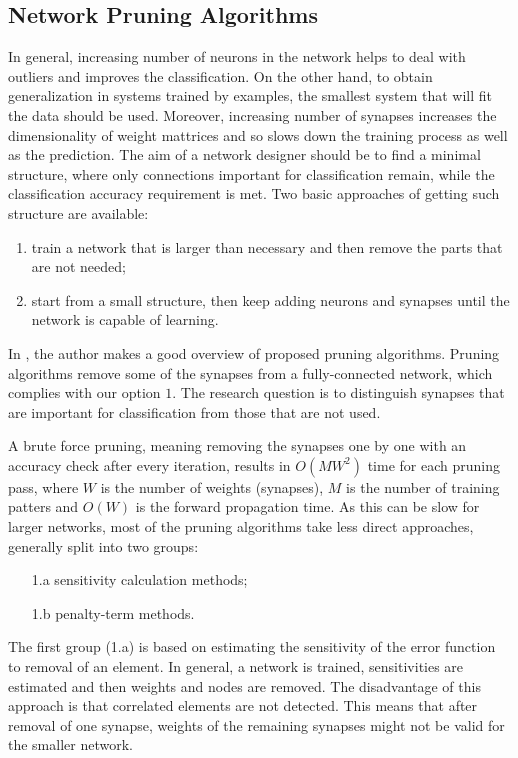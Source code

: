 \subsection*{Network Pruning Algorithms} \label{sec:soa_pruning_algorithms}
In general, increasing number of neurons in the network helps to deal with outliers and improves the classification. On the other hand, to obtain generalization in systems trained by examples, the smallest system that will fit the data should be used. Moreover, increasing number of synapses increases the dimensionality of weight mattrices and so slows down the training process as well as the prediction. The aim of a network designer should be to find a minimal structure, where only connections important for classification remain, while the classification accuracy requirement is met. Two basic approaches of getting such structure are available:

\begin{enumerate}
\item train a network that is larger than necessary and then remove the parts that are not needed;
\item start from a small structure, then keep adding neurons and synapses until the network is capable of learning.
\end{enumerate}

In \citep{article:10:pa}, the author makes a good overview of proposed pruning algorithms. Pruning algorithms remove some of the synapses from a fully-connected network, which complies with our option $ 1 $. The research question is to distinguish synapses that are important for classification from those that are not used.

A brute force pruning, meaning removing the synapses one by one with an accuracy check after every iteration, results in $ O(MW^2) $ time for each pruning pass, where $ W $ is the number of weights (synapses), $ M $ is the number of training patters and $ O(W) $ is the forward propagation time. As this can be slow for larger networks, most of the pruning algorithms take less direct approaches, generally split into two groups:

\begin{enumerate}
\item[1.a] sensitivity calculation methods;
\item[1.b] penalty-term methods.
\end{enumerate}

The first group (1.a) is based on estimating the sensitivity of the error function to removal of an element. In general, a network is trained, sensitivities are estimated and then weights and nodes are removed. The disadvantage of this approach is that correlated elements are not detected. This means that after removal of one synapse, weights of the remaining synapses might not be valid for the smaller network.

